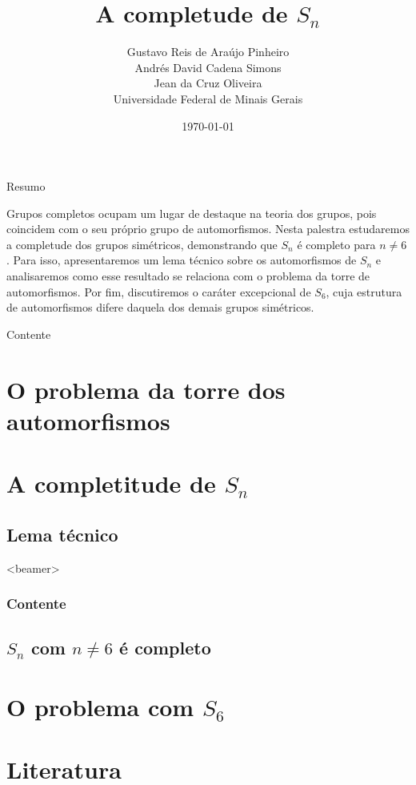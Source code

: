 \documentclass{beamer}
\title{A completude de $S_n$}
\author{\texorpdfstring{ 
Gustavo Reis de Araújo Pinheiro\\
Andrés David Cadena Simons\\
Jean da Cruz Oliveira\\
Universidade Federal de Minais Gerais}{A}}
\institute{ }
\date{\footnotesize \today}
\begin{document}
\begin{frame}
  \titlepage

\end{frame}

\begin{frame}{Resumo}
  \begin{block}{}
    Grupos completos ocupam um lugar de destaque na teoria dos grupos, pois coincidem com o seu próprio grupo de automorfismos. Nesta palestra estudaremos a completude dos grupos simétricos, demonstrando que $S_n$ é completo para $n\neq 6$. Para isso, apresentaremos um lema técnico sobre os automorfismos de $S_n$ e analisaremos como esse resultado se relaciona com o problema da torre de automorfismos. Por fim, discutiremos o caráter excepcional de $S_6$, cuja estrutura de automorfismos difere daquela dos demais grupos simétricos.
  \end{block}
\end{frame}

\begin{frame}{Contente}
  \tableofcontents
\end{frame}

\section{O problema da torre dos automorfismos}


\section{A completitude de $S_n$}
\subsection{Lema técnico}


\begin{frame}<beamer>
  \frametitle{Contente}
  \tableofcontents[currentsection]
\end{frame}

\subsection{$S_n$ com $n\neq 6$ é completo}


\section{O problema com $S_6$}


\section{Literatura}
\end{document}

